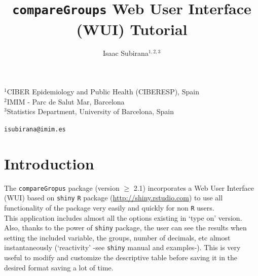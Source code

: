 \documentclass[11pt]{article}
\begin{document}
\title{\Large \bf {{\tt compareGroups} Web User Interface (WUI) Tutorial}}


\vspace{0.5cm}


\author{Isaac Subirana$^{1,2,3}$}

\maketitle

\begin{scriptsize}
\noindent $^{1}$CIBER Epidemiology and Public Health (CIBERESP), Spain \\
$^{2}$IMIM - Parc de Salut Mar, Barcelona \\
$^{3}$Statistics Department, University of Barcelona, Spain \\
\end{scriptsize} 


\begin{center}
\texttt{isubirana@imim.es}
\end{center}

\vspace{0.5cm}

\tableofcontents


\vspace{2cm}

\section{Introduction} \label{section-Introduction}

The {\tt compareGropus} package (version $\geq$ 2.1) incorporates a Web User Interface (WUI) based on {\tt shiny} {\tt R} package \citep{Shiny} (\href{http://shiny.rstudio.com}{http://shiny.rstudio.com}) to use all functionality of the package very easily and quickly for non {\tt R} users.\\

This application includes almost all the options existing in `type on' version. Also, thanks to the power of {\tt shiny} package, the user can see the results when setting the included variable, the groups, number of decimals, etc almost instantaneously (`reactivity' -see {\tt shiny} manual and examples-). This is very useful to modify and customize the descriptive table before saving it in the desired format saving a lot of time.\\
\end{document}
